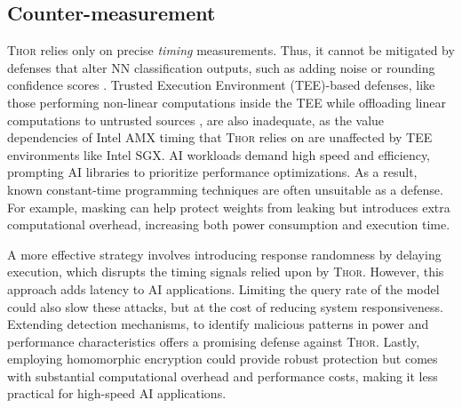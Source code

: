 \subsection{Counter-measurement}
\begin{comment}
\textsc{Thor} relies only on precise \textit{timing} measurements. Therefore, it cannot be mitigated by defenses that alter the classification output of NNs, such as adding noise or rounding confidence scores \cite{Fredrikson2015ModelInversion}. 
Trusted Execution Environment (TEE)-based defenses, such as those performing non-linear computations inside the TEE while offloading linear computations to untrusted sources \cite{tramèr2019slalomfastverifiableprivate}, are also inadequate since we confirmed that the value dependencies of Intel AMX timing that \textsc{Thor} relies on are unaffected by TEE environments like Intel SGX. 
AI workloads demand high speed and efficiency, prompting AI libraries to prioritize performance optimizations. As a result, known constant-time programming techniques are often unsuitable as a defense. For example, masking can help protect weights from leaking but introduces extra computational overhead, increasing both power consumption and execution time.
\end{comment}
\textsc{Thor} relies only on precise \textit{timing} measurements. Thus, it cannot be mitigated by defenses that alter NN classification outputs, such as adding noise or rounding confidence scores \cite{Fredrikson2015ModelInversion}. Trusted Execution Environment (TEE)-based defenses, like those performing non-linear computations inside the TEE while offloading linear computations to untrusted sources \cite{tramèr2019slalomfastverifiableprivate}, are also inadequate, as the value dependencies of Intel AMX timing that \textsc{Thor} relies on are unaffected by TEE environments like Intel SGX. AI workloads demand high speed and efficiency, prompting AI libraries to prioritize performance optimizations. As a result, known constant-time programming techniques are often unsuitable as a defense. For example, masking can help protect weights from leaking but introduces extra computational overhead, increasing both power consumption and execution time.

A more effective strategy involves introducing response randomness by delaying execution, which disrupts the timing signals relied upon by \textsc{Thor}. However, this approach adds latency to AI applications. Limiting the query rate of the model 
could also slow these attacks, but at the cost of reducing system responsiveness.
Extending detection mechanisms, 
to identify malicious patterns in power and performance characteristics offers a promising defense against \textsc{Thor}.
Lastly, employing homomorphic encryption 
could provide robust protection but comes with substantial computational overhead and performance costs, making it less practical for high-speed AI applications.


